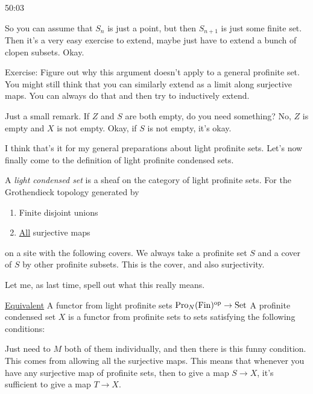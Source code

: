 \begin{example}
\begin{unfinished}{50:03}
\begin{sketch}
So you can assume that $S_n$ is just a point, but then $S_{n+1}$ is just some finite set. Then it's a very easy exercise to extend, maybe just have to extend a bunch of clopen subsets. Okay.

\end{sketch}

Exercise: Figure out why this argument doesn't apply to a general profinite set. You might still think that you can similarly extend as a limit along surjective maps. You can always do that and then try to inductively extend.

\begin{remark}

Just a small remark. If $Z$ and $S$ are both empty, do you need something? No, $Z$ is empty and $X$ is not empty. Okay, if $S$ is not empty, it's okay.

\end{remark}

I think that's it for my general preparations about light profinite sets. Let's now finally come to the definition of light profinite condensed sets.

\begin{definition}

A \emph{light condensed set} is a sheaf on the category of light profinite sets. For the Grothendieck topology generated by 

\begin{enumerate}
\item Finite disjoint unions
\item \underline{All} surjective maps
\end{enumerate} 

\end{definition}

on a site with the following covers. We always take a profinite set $S$ and a cover of $S$ by other profinite subsets. This is the cover, and also surjectivity.

Let me, as last time, spell out what this really means.

\underline{Equivalent} A functor from light profinite sets $\operatorname{Pro}_{N}(\operatorname{Fin})^{\mathrm{op}} \to \mathrm{Set}$
 A profinite condensed set $X$ is a functor from profinite sets to sets satisfying the following conditions:

Just need to $M$ both of them individually, and then there is this funny condition. This comes from allowing all the surjective maps. This means that whenever you have any surjective map of profinite sets, then to give a map $S \to X$, it's sufficient to give a map $T \to X$. 


\end{unfinished}
\end{example}
